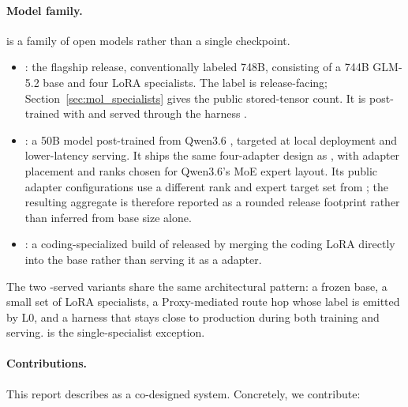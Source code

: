 \paragraph{Model family.}
\macaron{} is a family of open models rather than a single checkpoint.
\begin{itemize}[leftmargin=*]
  \item \venti{}: the flagship release, conventionally labeled 748B,
  consisting of a 744B GLM-5.2 base
  \citep{glm52_2026,glm5_2026} and four LoRA specialists. The label is
  release-facing; Section~\ref{sec:mol_specialists} gives the public
  stored-tensor count. It is
  post-trained with \mint{}
  \citep{lu2026announcing} and served through the \molshort{} harness
  \citep{mol_harness2026}.

  \item \tall{}: a 50B model post-trained from Qwen3.6
  \citep{qwen36_2026,qwen3_2025}, targeted at local deployment and
  lower-latency serving. It ships the same four-adapter \molshort{} design as
  \venti{}, with adapter placement and ranks chosen for Qwen3.6's MoE expert
  layout. Its public adapter configurations use a different rank and expert
  target set from \venti{}; the resulting aggregate is therefore reported as a
  rounded release footprint rather than inferred from base size alone.

  \item \codingventi{}: a coding-specialized build of \venti{} released
  by merging the coding LoRA directly into the base rather than serving it
  as a \molshort{} adapter.
\end{itemize}

The two \molshort{}-served variants share the same architectural pattern: a
frozen base, a small set of LoRA specialists, a Proxy-mediated route hop whose
label is emitted by L0, and a harness that stays close to production during both
training and serving. \codingventi{} is the single-specialist exception.

\paragraph{Contributions.}
This report describes \macaron{} as a co-designed system. Concretely, we
contribute:

